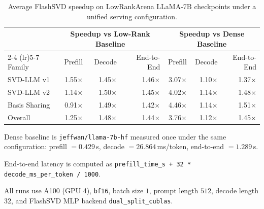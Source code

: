 
\begin{table}[t]
\centering
\small
\begin{threeparttable}
\caption{Average FlashSVD speedup on LowRankArena LLaMA-7B checkpoints under a unified serving configuration.}
\label{tab:flashsvd-lowrankarena-summary}
\begin{tabular}{lrrrrrr}
\toprule
& \multicolumn{3}{c}{Speedup vs Low-Rank Baseline} & \multicolumn{3}{c}{Speedup vs Dense Baseline} \\
\cmidrule(lr){2-4} \cmidrule(lr){5-7}
Family & Prefill & Decode & End-to-End & Prefill & Decode & End-to-End \\
\midrule
SVD-LLM v1      & 1.55$\times$ & 1.45$\times$ & 1.46$\times$ & 3.07$\times$ & 1.10$\times$ & 1.37$\times$ \\
SVD-LLM v2      & 1.14$\times$ & 1.50$\times$ & 1.45$\times$ & 4.02$\times$ & 1.14$\times$ & 1.48$\times$ \\
Basis Sharing   & 0.91$\times$ & 1.49$\times$ & 1.42$\times$ & 4.46$\times$ & 1.14$\times$ & 1.51$\times$ \\
\midrule
Overall         & 1.25$\times$ & 1.48$\times$ & 1.44$\times$ & 3.76$\times$ & 1.12$\times$ & 1.45$\times$ \\
\bottomrule
\end{tabular}
\begin{tablenotes}[flushleft]\footnotesize
\item Dense baseline is \texttt{jeffwan/llama-7b-hf} measured once under the same configuration: prefill $=0.429$\,s, decode $=26.864$\,ms/token, end-to-end $=1.289$\,s.
\item End-to-end latency is computed as \texttt{prefill\_time\_s + 32 * decode\_ms\_per\_token / 1000}.
\item All runs use A100 (GPU 4), \texttt{bf16}, batch size $1$, prompt length $512$, decode length $32$, and FlashSVD MLP backend \texttt{dual\_split\_cublas}.
\end{tablenotes}
\end{threeparttable}
\end{table}

